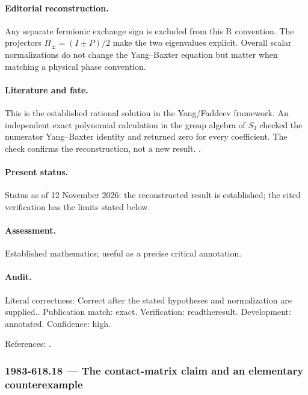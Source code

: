 \paragraph{Editorial reconstruction.} Any separate fermionic exchange sign is excluded from this R convention. The projectors $\Pi_\pm=(I\pm P)/2$ make the two eigenvalues explicit. Overall scalar normalizations do not change the Yang--Baxter equation but matter when matching a physical phase convention.

\paragraph{Literature and fate.} This is the established rational solution in the Yang/Faddeev framework. An independent exact polynomial calculation in the group algebra of $S_3$ checked the numerator Yang--Baxter identity and returned zero for every coefficient. The check confirms the reconstruction, not a new result. \citep{yang1967manybody,faddeev1996bethe}.

\paragraph{Present status.} Status as of 12 November 2026: the reconstructed result is established; the cited verification has the limits stated below.

\paragraph{Assessment.} Established mathematics; useful as a precise critical annotation.

\paragraph{Audit.} Literal correctness: Correct after the stated hypotheses and normalization are supplied.. Publication match: exact. Verification: readtheresult. Development: annotated. Confidence: high.

\noindent References: \citep{yang1967manybody,faddeev1996bethe}.\par

\subsubsection{1983-618.18 --- The contact-matrix claim and an elementary counterexample}

\label{item:1983-618.18}

